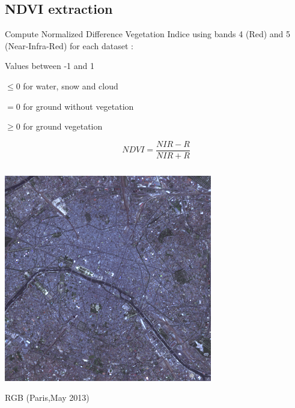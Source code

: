 \documentclass[c]{beamer}
\begin{document}
\subsection{NDVI extraction}
\begin{frame}
\tableofcontents[currentsubsection]
\end{frame}

\begin{frame}
\begin{itemize}
{
 \item Compute Normalized Difference Vegetation Indice using bands 4 (Red) and 5 (Near-Infra-Red) for each dataset :
 \item Values between -1 and 1
 \item $\leq 0$ for water, snow and cloud
 \item $= 0$ for  ground without vegetation
 \item $\geq 0$ for ground vegetation
}
\end{itemize}
{\scriptsize \[NDVI=\frac{NIR-R}{NIR+R}\]}
\begin{columns}
 \begin{column}{0.33\textwidth}
  \begin{overlayarea}{\linewidth}{2cm}
  \centering\vfill
  \includegraphics[scale=0.15]{images/Paris/05_rgb.png}
  \end{overlayarea}
  \begin{overlayarea}{\linewidth}{0.5cm}
  \centering
  \tiny RGB (Paris,May 2013) \par
  \end{overlayarea}
 \end{column}
  \begin{column}{0.33\textwidth}

\end{column}
\end{columns}
\end{frame}
\end{document}
